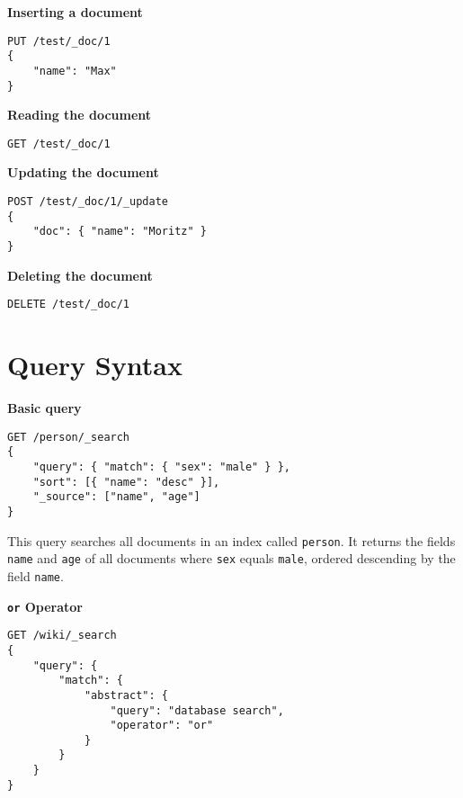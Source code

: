 \begin{minipage}[c]{0.95\textwidth}
    \textbf{Inserting a document}
    \begin{lstlisting}
PUT /test/_doc/1
{
    "name": "Max"
}
    \end{lstlisting}
\end{minipage}

\begin{minipage}[c]{0.95\textwidth}
    \textbf{Reading the document}
    \begin{lstlisting}
GET /test/_doc/1
    \end{lstlisting}
\end{minipage}

\begin{minipage}[c]{0.95\textwidth}
    \textbf{Updating the document}
    \begin{lstlisting}
POST /test/_doc/1/_update
{
    "doc": { "name": "Moritz" }
}
    \end{lstlisting}
\end{minipage}

\begin{minipage}[c]{0.95\textwidth}
    \textbf{Deleting the document}
    \begin{lstlisting}
DELETE /test/_doc/1
    \end{lstlisting}
\end{minipage}


\section{Query Syntax}

\begin{minipage}[c]{0.95\textwidth}
    \textbf{Basic query}
    \begin{lstlisting}
GET /person/_search
{
    "query": { "match": { "sex": "male" } },
    "sort": [{ "name": "desc" }],
    "_source": ["name", "age"]
}
    \end{lstlisting}
\end{minipage}

This query searches all documents in an index called \texttt{person}. It returns the fields \texttt{name} and \texttt{age} of all documents where \texttt{sex} equals \texttt{male}, ordered descending by the field \texttt{name}.

\bigskip

\begin{minipage}[c]{0.95\textwidth}
    \textbf{\texttt{or} Operator}
    \begin{lstlisting}
GET /wiki/_search
{
    "query": {
        "match": {
            "abstract": {
                "query": "database search",
                "operator": "or"
            }
        }
    }
}
    \end{lstlisting}
\end{minipage}

